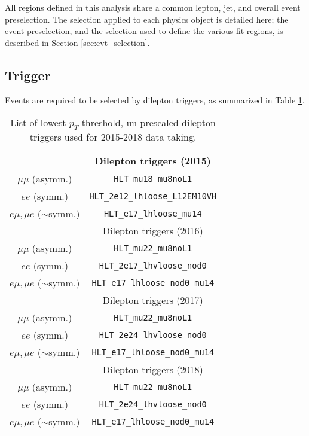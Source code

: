 
All regions defined in this analysis share a common lepton, jet, and overall event preselection. The selection applied to each physics object is detailed here; the event preselection, and the selection used to define the various fit regions, is described in Section \ref{sec:evt_selection}.

\subsection{Trigger}

Events are required to be selected by dilepton triggers, as summarized in Table \ref{tbl:trigger}. 

\begin{table}[H]
 \begin{center}
   \begin{tabular}{cc}
     \toprule
                  & Dilepton triggers (2015) \\
     \midrule
      $\mu\mu$ (asymm.)          & \verb!HLT_mu18_mu8noL1! \\
      $ee$ (symm.)               & \verb!HLT_2e12_lhloose_L12EM10VH! \\
      $e\mu,\mu e$ ($\sim$symm.) & \verb!HLT_e17_lhloose_mu14! \\
     \bottomrule
                       & Dilepton triggers (2016) \\
     \midrule
      $\mu\mu$ (asymm.)                   & \verb!HLT_mu22_mu8noL1! \\
      $ee$ (symm.)                        & \verb!HLT_2e17_lhvloose_nod0! \\
      $e\mu,\mu e$ ($\sim$symm.)          & \verb!HLT_e17_lhloose_nod0_mu14! \\
     \bottomrule

                  & Dilepton triggers (2017) \\
     \midrule
      $\mu\mu$ (asymm.)                   & \verb!HLT_mu22_mu8noL1! \\
      $ee$ (symm.)                        & \verb!HLT_2e24_lhvloose_nod0! \\
      $e\mu,\mu e$ ($\sim$symm.)          & \verb!HLT_e17_lhloose_nod0_mu14! \\
     \bottomrule
                  & Dilepton triggers (2018) \\
     \midrule
      $\mu\mu$ (asymm.)                   & \verb!HLT_mu22_mu8noL1! \\
      $ee$ (symm.)                        & \verb!HLT_2e24_lhvloose_nod0! \\
      $e\mu,\mu e$ ($\sim$symm.)          & \verb!HLT_e17_lhloose_nod0_mu14! \\ 
      \bottomrule
   \end{tabular}
   \caption{\label{tbl:trigger} List of lowest $p_{T}$-threshold, un-prescaled dilepton triggers used for 2015-2018 data taking.}
 \end{center}
\end{table}

